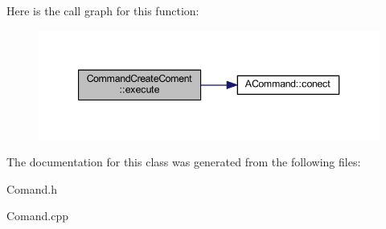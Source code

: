 Here is the call graph for this function\-:\nopagebreak
\begin{figure}[H]
\begin{center}
\leavevmode
\includegraphics[width=344pt]{class_command_create_coment_aaefce07a8f35b3e236edc0ef8d68b756_cgraph}
\end{center}
\end{figure}




The documentation for this class was generated from the following files\-:\begin{DoxyCompactItemize}
\item 
Comand.\-h\item 
Comand.\-cpp\end{DoxyCompactItemize}
